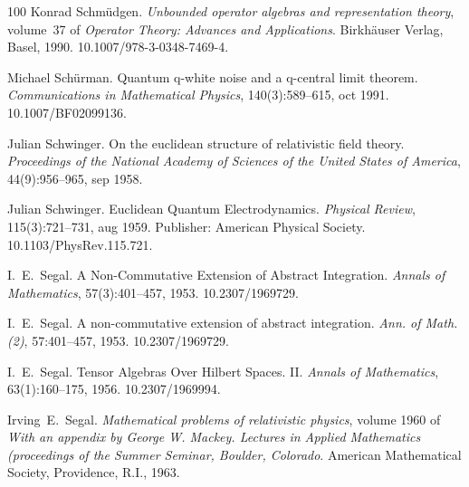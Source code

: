 \documentclass{article}
\newcommand{\tmtextit}[1]{{\itshape{#1}}}
\begin{document}
\begin{thebibliography}{100}
  Konrad Schm{\"u}dgen.
  {\newblock}\tmtextit{Unbounded operator algebras and representation theory},
  volume~37  of \tmtextit{Operator Theory: Advances and Applications}.
  {\newblock}Birkh{\"a}user Verlag, Basel, 1990.
  {\newblock}\href{Https://doi.org/10.1007/978-3-0348-7469-4}{}10.1007/978-3-0348-7469-4.{\newblock}
  
  Michael Sch{\"u}rman. {\newblock}Quantum
  q-white noise and a q-central limit theorem.
  {\newblock}\tmtextit{Communications in Mathematical Physics},
  140(3):589--615, oct 1991.
  {\newblock}\href{Https://doi.org/10.1007/BF02099136}{}10.1007/BF02099136.{\newblock}
  
  Julian Schwinger. {\newblock}On the
  euclidean structure of relativistic field theory.
  {\newblock}\tmtextit{Proceedings of the National Academy of Sciences of the
  United States of America}, 44(9):956--965, sep 1958.{\newblock}
  
  Julian Schwinger.
  {\newblock}Euclidean Quantum Electrodynamics. {\newblock}\tmtextit{Physical
  Review}, 115(3):721--731, aug 1959. {\newblock}Publisher: American Physical
  Society.
  \href{https://doi.org/10.1103/PhysRev.115.721}{}10.1103/PhysRev.115.721.{\newblock}
  
  I.~E.~Segal. {\newblock}A
  Non-Commutative Extension of Abstract Integration.
  {\newblock}\tmtextit{Annals of Mathematics}, 57(3):401--457, 1953.
  {\newblock}\href{Https://doi.org/10.2307/1969729}{}10.2307/1969729.{\newblock}
  
  I.~E.~Segal. {\newblock}A non-commutative extension of
  abstract integration. {\newblock}\tmtextit{Ann. of Math. (2)}, 57:401--457,
  1953.
  {\newblock}\href{Https://doi.org/10.2307/1969729}{}10.2307/1969729.{\newblock}
  
  I.~E.~Segal. {\newblock}Tensor Algebras Over
  Hilbert Spaces. II. {\newblock}\tmtextit{Annals of Mathematics},
  63(1):160--175, 1956.
  {\newblock}\href{Https://doi.org/10.2307/1969994}{}10.2307/1969994.{\newblock}
  
  Irving~E.~Segal. {\newblock}\tmtextit{Mathematical
  problems of relativistic physics},  volume  1960  of \tmtextit{With an
  appendix by George W. Mackey. Lectures in Applied Mathematics (proceedings
  of the Summer Seminar, Boulder, Colorado}. {\newblock}American Mathematical
  Society, Providence, R.I., 1963.{\newblock}
  

\end{thebibliography}
\end{document}
